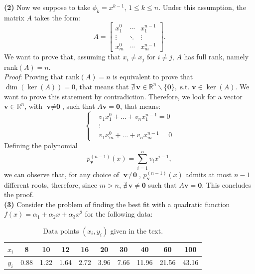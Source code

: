 \documentclass[a4paper,11pt]{article}
\newcommand{\R}{\mathbb{R}}
\begin{document}
\noindent \textbf{(2)} Now we suppose to take $\phi_k = x^{k-1}$, $1 \le k \le n$. Under this assumption, the matrix $A$ takes the form:
\begin{equation}\label{key}
	A = \begin{bmatrix}
		x_1^0 & \cdots & x_1^{n-1}  \\
		\vdots & \ddots & \vdots \\
		x_m^0 & \cdots  & x_m^{n-1}
	\end{bmatrix}.
\end{equation}
We want to prove that, assuming that $x_i\neq x_j$ for $i \neq j$, $A$ has full rank, namely $\text{rank}(A) = n$.\\
\textit{Proof}: Proving that $\text{rank}(A) = n$ is equivalent to prove that $\dim(\ker(A)) = 0$, that means that $\nexists\, \textbf{v} \in \R^n \smallsetminus \{\textbf{0}\}, \text{ s.t. } \textbf{v} \in \ker(A)$. We want to prove this statement by contradiction. Therefore, we look for a vector $\textbf{v} \in \R^n$, with $\textbf{v} \neq \textbf{0}$, such that $A\textbf{v}=\textbf{0}$, that means:
\begin{equation}\label{key}
	\left\lbrace 
	\begin{split}
		&  v_1 x_1^0 + \dots + v_n x_1^{n-1} = 0\\
		& \vdots  \\
		&  v_1 x_m^0 + \dots + v_n x_m^{n-1} = 0 
	\end{split} \right.
\end{equation}
Defining the polynomial 
\begin{equation}\label{key}
	p^{(n-1)}_{\textbf{v}}(x) = \sum_{i=1}^{n} v_i x^{i-1},
\end{equation}
we can observe that, for any choice of $\textbf{v} \neq \textbf{0}$, $p^{(n-1)}_{\textbf{v}}(x)$ admits at most $n-1$ different roots, therefore, since $m>n$, $\nexists \, \textbf{v} \neq \textbf{0}$ such that $A\textbf{v}=\textbf{0}$. This concludes the proof. \qedsymbol\\

\noindent \textbf{(3)} Consider the problem of finding the best fit with a quadratic function $f(x) = \alpha_1 + \alpha_2 x + \alpha_3 x^2$ for the following data:\\
	
\begin{table}
	\centering
	\begin{tabular}{c|c|c|c|c|c|c|c|c|c}
	$x_i$& 8 & 10 & 12 & 16 & 20 & 30 & 40 & 60 & 100 \\
	\hline
	$y_i$& 0.88 & 1.22 & 1.64 & 2.72 & 3.96 & 7.66 & 11.96 & 21.56 & 43.16 \\
	\end{tabular}
	\caption{Data points $(x_{i},y_{i})$ given in the text.}
	\label{Tab:Data_points}
\end{table}
\end{document}
